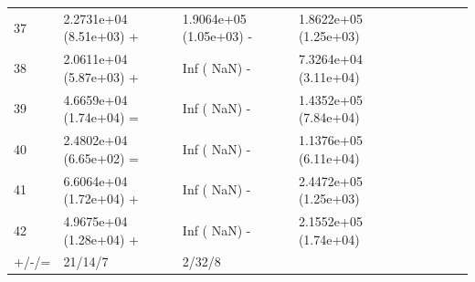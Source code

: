\documentclass[11pt]{article}
\begin{document}
\begin{table}[htbp]
{\begin{tabular}{lllllllll}
37    & 2.2731e+04 (8.51e+03) + & 1.9064e+05 (1.05e+03) - & 1.8622e+05 (1.25e+03) \\
38    & 2.0611e+04 (5.87e+03) + & Inf (     NaN) -        & 7.3264e+04 (3.11e+04) \\
39    & 4.6659e+04 (1.74e+04) = & Inf (     NaN) -        & 1.4352e+05 (7.84e+04) \\
40    & 2.4802e+04 (6.65e+02) = & Inf (     NaN) -        & 1.1376e+05 (6.11e+04) \\
41    & 6.6064e+04 (1.72e+04) + & Inf (     NaN) -        & 2.4472e+05 (1.25e+03) \\
42    & 4.9675e+04 (1.28e+04) + & Inf (     NaN) -        & 2.1552e+05 (1.74e+04) \\
\hline
+/-/= & 21/14/7                 & 2/32/8                  & \multicolumn{1}{l}{} 
\\
\hline
\end{tabular}
}
\end{table}
\end{document}
